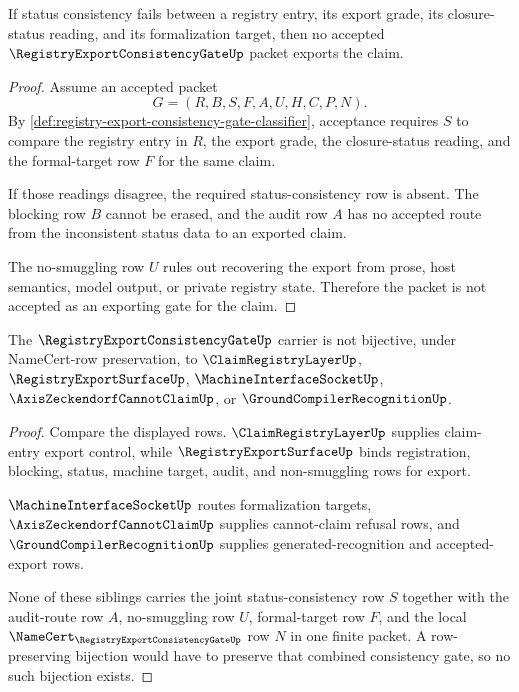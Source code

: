 \begin{theorem}
\label{thm:registry-export-consistency-gate-no-conflict-export}
If status consistency fails between a registry entry, its export grade, its closure-status reading, and its formalization target, then no accepted $\RegistryExportConsistencyGateUp$ packet exports the claim.
\end{theorem}
\begin{proof}
Assume an accepted packet
$$
G=(R,B,S,F,A,U,H,C,P,N).
$$
By \autoref{def:registry-export-consistency-gate-classifier}, acceptance requires $S$ to compare the registry entry in $R$, the export grade, the closure-status reading, and the formal-target row $F$ for the same claim.

If those readings disagree, the required status-consistency row is absent. The blocking row $B$ cannot be erased, and the audit row $A$ has no accepted route from the inconsistent status data to an exported claim.

The no-smuggling row $U$ rules out recovering the export from prose, host semantics, model output, or private registry state. Therefore the packet is not accepted as an exporting gate for the claim.
\end{proof}

\begin{theorem}
\label{thm:registry-export-consistency-gate-sibling-dependency}
The $\RegistryExportConsistencyGateUp$ carrier is not bijective, under NameCert-row preservation, to $\ClaimRegistryLayerUp$, $\RegistryExportSurfaceUp$, $\MachineInterfaceSocketUp$, $\AxisZeckendorfCannotClaimUp$, or $\GroundCompilerRecognitionUp$.
\end{theorem}
\begin{proof}
Compare the displayed rows. $\ClaimRegistryLayerUp$ supplies claim-entry export control, while $\RegistryExportSurfaceUp$ binds registration, blocking, status, machine target, audit, and non-smuggling rows for export.

$\MachineInterfaceSocketUp$ routes formalization targets, $\AxisZeckendorfCannotClaimUp$ supplies cannot-claim refusal rows, and $\GroundCompilerRecognitionUp$ supplies generated-recognition and accepted-export rows.

None of these siblings carries the joint status-consistency row $S$ together with the audit-route row $A$, no-smuggling row $U$, formal-target row $F$, and the local $\NameCert_{\RegistryExportConsistencyGateUp}$ row $N$ in one finite packet. A row-preserving bijection would have to preserve that combined consistency gate, so no such bijection exists.
\end{proof}

